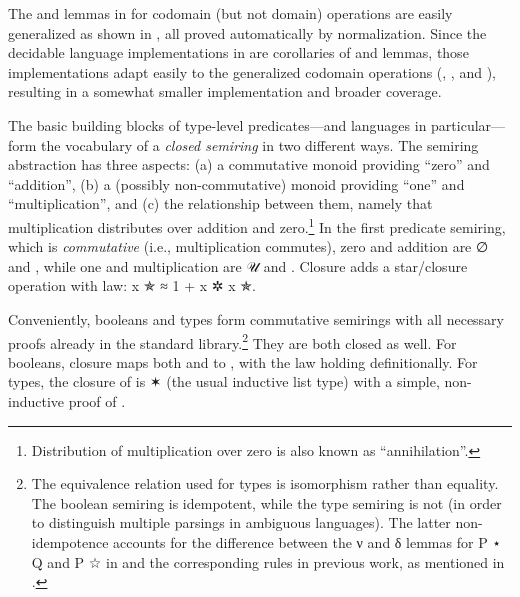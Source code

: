 \documentclass[acmsmall,screen,timestamp,anonymous,review]{acmart}
\begin{document}
\rnc{}
The  and  lemmas in  for codomain (but not domain) operations are easily generalized as shown in , all proved automatically by normalization.
Since the decidable language implementations in  are corollaries of  and  lemmas, those implementations adapt easily to the generalized codomain operations (, , and ), resulting in a somewhat smaller implementation and broader coverage.



The basic building blocks of type-level predicates---and languages in particular---form the vocabulary of a \emph{closed semiring} in two different ways.
The semiring abstraction has three aspects: (a) a commutative monoid providing ``zero'' and ``addition'', (b) a (possibly non-commutative) monoid providing ``one'' and ``multiplication'', and (c) the relationship between them, namely that multiplication distributes over addition and zero.\footnote{Distribution of multiplication over zero is also known as ``annihilation''.}
In the first predicate semiring, which is \emph{commutative} (i.e., multiplication commutes), zero and addition are \AF ∅ and , while one and multiplication are \AF 𝒰 and .
Closure adds a star/closure operation  with  law: {\AB x \AF ✯ \AF ≈ 1 \AF + \AB x \AF ✲ \AB x \AF ✯}.

Conveniently, booleans and types form commutative semirings with all necessary proofs already in the standard library.\footnote{The equivalence relation used for types is isomorphism rather than equality.
The boolean semiring is idempotent, while the type semiring is not (in order to distinguish multiple parsings in ambiguous languages).
The latter non-idempotence accounts for the difference between the \AF ν and \AF δ lemmas for {\AB P ⋆ \AB Q} and {\AB P ☆} in  and the corresponding rules in previous work, as mentioned in .}
They are both closed as well.
For booleans, closure maps both  and  to , with the  law holding definitionally.
For types, the closure of  is { ✶} (the usual inductive list type) with a simple, non-inductive proof of .
\end{document}

